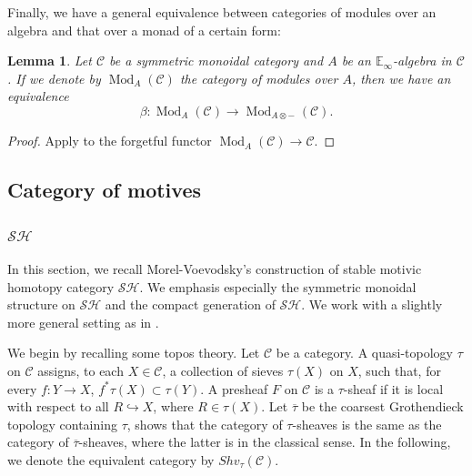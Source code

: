 \documentclass{article}
\newtheorem{lm}[thm]{Lemma}
\theoremstyle{definition}
\newcommand{\on}{\operatorname}
\begin{document}
Finally, we have a general equivalence between categories of modules over an algebra and that over a monad of a certain form:
\begin{lm}
Let $\mathcal{C}$ be a symmetric monoidal category and $A$ be an $\mathbb{E}_\infty$-algebra in $\mathcal{C}$. If we denote by $\on{Mod}_A(\mathcal{C})$ the category of modules over $A$, then we have an equivalence
\[
\beta:\on{Mod}_A(\mathcal{C})\rightarrow\on{Mod}_{A\otimes-}(\mathcal{C}).\]
\end{lm}
\begin{proof}
Apply \cite[Theorem 4.7.3.5]{HA} to the forgetful functor $\on{Mod}_A(\mathcal{C})\rightarrow\mathcal{C}$.\end{proof}





\subsection{Category of motives}
\subsubsection{$\mathcal{SH}$}\label{SH}
In this section, we recall Morel-Voevodsky's construction of stable motivic homotopy category $\mathcal{SH}$. We emphasis especially the symmetric monoidal structure on $\mathcal{SH}$ and the compact generation of $\mathcal{SH}$. We work with a slightly more general setting as in \cite[Appendix C]{Hoy}.


We begin by recalling some topos theory. Let $\mathcal{C}$ be a category. A quasi-topology $\tau$ on $\mathcal{C}$ assigns, to each $X\in\mathcal{C}$, a collection of sieves $\tau(X)$ on $X$, such that, for every $f: Y\rightarrow X$, $f^\ast\tau(X)\subset\tau(Y).$ A presheaf $F$ on $\mathcal{C}$ is a $\tau$-sheaf if it is local with respect to all $R\hookrightarrow X$, where $R\in\tau(X)$. Let $\overline{\tau}$ be the coarsest Grothendieck topology containing $\tau$, \cite[Corollary C.2]{Hoy} shows that the category of $\tau$-sheaves is the same as the category of $\overline{\tau}$-sheaves, where the latter is in the classical sense. In the following, we denote the equivalent category by $Shv_\tau(\mathcal{C}).$
\end{document}
